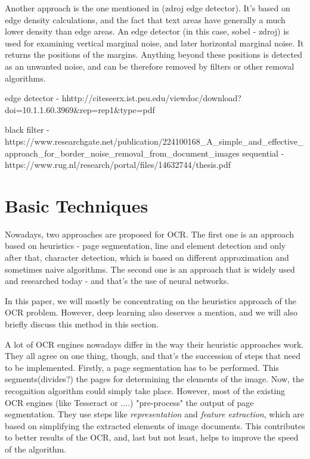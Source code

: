 Another approach is the one mentioned in (zdroj edge detector). It's based on edge density calculations, and the fact that text areas have generally a much lower density than edge areas. An edge detector (in this case, sobel - zdroj) is used for examining vertical marginal noise, and later horizontal marginal noise. It returns the positions of the margins. Anything beyond these positions is detected as an unwanted noise, and can be therefore removed by filters or other removal algorithms.

edge detector - hhttp://citeseerx.ist.psu.edu/viewdoc/download?doi=10.1.1.60.3969&rep=rep1&type=pdf

black filter -  https://www.researchgate.net/publication/224100168_A_simple_and_effective_approach_for_border_noise_removal_from_document_images
sequential - https://www.rug.nl/research/portal/files/14632744/thesis.pdf

\section{Basic Techniques}

Nowadays, two approaches are proposed for OCR. The first one is an approach based on heuristics - page segmentation, line and element detection and only after that, character detection, which is based on different approximation and sometimes naive algorithms. The second one is an approach that is widely used and researched today - and that's the use of neural networks.

In this paper, we will mostly be concentrating on the heuristics approach of the OCR problem. However, deep learning also deserves a mention, and we will also briefly discuss this method in this section.

A lot of OCR engines nowadays differ in the way their heuristic approaches work. They all agree on one thing, though, and that's the succession of steps that need to be implemented. Firstly, a page segmentation has to be performed. This segments(divides?) the pages for determining the elements of the image. Now, the recognition algorithm could simply take place. However, most of the existing OCR engines (like Tesseract or ....) "pre-process" the output of page segmentation. They use steps like \emph{representation} and \emph{feature extraction}, which are based on simplifying the extracted elements of image documents. This contributes to better results of the OCR, and, last but not least, helps to improve the speed of the algorithm.

